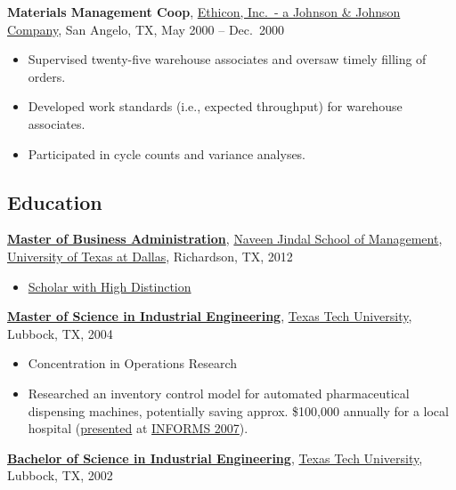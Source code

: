 \documentclass[
]{article}
\providecommand{\tightlist}{%
  \setlength{\itemsep}{0pt}\setlength{\parskip}{0pt}}
\begin{document}
\textbf{Materials Management Coop},
\href{https://www.ethicon.com/}{Ethicon, Inc.~- a Johnson \& Johnson
Company}, San Angelo, TX, May 2000 -- Dec.~2000

\begin{itemize}
\tightlist
\item
  Supervised twenty-five warehouse associates and oversaw timely filling
  of orders.
\item
  Developed work standards (i.e., expected throughput) for warehouse
  associates.
\item
  Participated in cycle counts and variance analyses.
\end{itemize}

\hypertarget{education}{%
\subsection{Education}\label{education}}

\href{https://mba.utdallas.edu/academics/professional-mba-online/}{\textbf{Master
of Business Administration}}, \href{https://jindal.utdallas.edu/}{Naveen
Jindal School of Management},
\href{https://www.utdallas.edu/}{University of Texas at Dallas},
Richardson, TX, 2012

\begin{itemize}
\tightlist
\item
  \href{https://jindal.utdallas.edu/academic-programs/graduate-degree-academic-honors/}{Scholar
  with High Distinction}
\end{itemize}

\href{https://www.depts.ttu.edu/imse/graduate/industrial_engineering_ms.php}{\textbf{Master
of Science in Industrial Engineering}},
\href{https://www.ttu.edu/}{Texas Tech University}, Lubbock, TX, 2004

\begin{itemize}
\tightlist
\item
  Concentration in Operations Research
\item
  Researched an inventory control model for automated pharmaceutical
  dispensing machines, potentially saving approx. \$100,000 annually for
  a local hospital
  (\href{https://stevemyles.site/blog/2007/10/30/informs-2007-presentations/}{presented}
  at
  \href{https://web.archive.org/web/20140731003202/http://meetings2.informs.org/Seattle07/}{INFORMS
  2007}).
\end{itemize}

\href{https://www.depts.ttu.edu/imse/undergrad/index.php}{\textbf{Bachelor
of Science in Industrial Engineering}},
\href{https://www.ttu.edu/}{Texas Tech University}, Lubbock, TX, 2002
\end{document}
